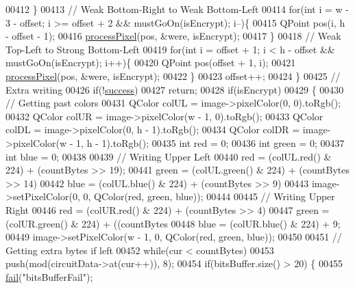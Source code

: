 \begin{DoxyCode}
00412         \}
00413         \textcolor{comment}{// Weak Bottom-Right to Weak Bottom-Left}
00414         \textcolor{keywordflow}{for}(\textcolor{keywordtype}{int} i = w - 3 - offset; i >= offset + 2 && mustGoOn(isEncrypt); i--)\{
00415             QPoint pos(i, h - offset - 1);
00416             \hyperlink{class_model_p_c_a1171f9fe1550133dc9053a46b4e5bcfd}{processPixel}(pos, &were, isEncrypt);
00417         \}
00418         \textcolor{comment}{// Weak Top-Left to Strong Bottom-Left}
00419         \textcolor{keywordflow}{for}(\textcolor{keywordtype}{int} i = offset + 1; i < h - offset && mustGoOn(isEncrypt); i++)\{
00420             QPoint pos(offset + 1, i);
00421             \hyperlink{class_model_p_c_a1171f9fe1550133dc9053a46b4e5bcfd}{processPixel}(pos, &were, isEncrypt);
00422         \}
00423         offset++;
00424     \}
00425     \textcolor{comment}{// Extra writing}
00426     \textcolor{keywordflow}{if}(!\hyperlink{class_model_p_c_a945ffbbc44a832b953c191debd448f4c}{success})
00427         \textcolor{keywordflow}{return};
00428     \textcolor{keywordflow}{if}(isEncrypt)
00429     \{
00430         \textcolor{comment}{// Getting past colors}
00431         QColor colUL = image->pixelColor(0, 0).toRgb();
00432         QColor colUR = image->pixelColor(w - 1, 0).toRgb();
00433         QColor colDL = image->pixelColor(0, h - 1).toRgb();
00434         QColor colDR = image->pixelColor(w - 1, h - 1).toRgb();
00435         \textcolor{keywordtype}{int} red = 0;
00436         \textcolor{keywordtype}{int} green = 0;
00437         \textcolor{keywordtype}{int} blue = 0;
00438 
00439         \textcolor{comment}{// Writing Upper Left}
00440         red = (colUL.red() & 224) + (countBytes >> 19);
00441         green = (colUL.green() & 224) + (countBytes >> 14) %
00442         blue = (colUL.blue() & 224) + (countBytes >> 9) %
00443         image->setPixelColor(0, 0, QColor(red, green, blue));
00444 
00445         \textcolor{comment}{// Writing Upper Right}
00446         red = (colUR.red() & 224) + (countBytes >> 4) %
00447         green = (colUR.green() & 224) + ((countBytes %
00448         blue = (colUR.blue() & 224) + 9;
00449         image->setPixelColor(w - 1, 0, QColor(red, green, blue));
00450 
00451         \textcolor{comment}{// Getting extra bytes if left}
00452         \textcolor{keywordflow}{while}(cur < countBytes)
00453             push(mod(circuitData->at(cur++)), 8);
00454         \textcolor{keywordflow}{if}(bitsBuffer.size() > 20) \{
00455             \hyperlink{class_model_p_c_a47464b59b7e37fcee25e55475708aabd}{fail}(\textcolor{stringliteral}{"bitsBufferFail"});

\end{DoxyCode}
